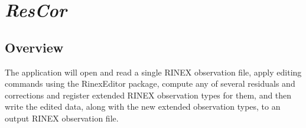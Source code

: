 %
%

\section{\emph{ResCor}}
\subsection{Overview}
The application will open and read a single RINEX observation file, apply editing commands
   using the RinexEditor package, compute any of several residuals and corrections and
   register extended RINEX observation types for them, and then write the edited data,
   along with the new extended observation types, to an output RINEX observation file.

